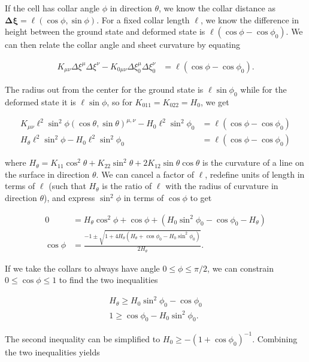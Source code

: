 \documentclass[draft]{article}
\begin{document}
If the cell has collar angle $\phi$ in direction $\theta$, we know the collar distance as $\bm{\Delta\xi} = \ell(\cos\phi, \sin\phi)$. For a fixed collar length $\ell$, we know the difference in height between the ground state and deformed state is $\ell(\cos\phi - \cos\phi_0)$. We can then relate the collar angle and sheet curvature by equating 

\begin{align}
    K_{\mu\nu}\Delta\xi^\mu\Delta\xi^\nu - K_{0\mu\nu}\Delta\xi_0^\mu\Delta\xi_0^\nu &= \ell(\cos\phi - \cos\phi_0). \label{eq:base}
\end{align}

The radius out from the center for the ground state is $\ell\sin\phi_0$ while for the deformed state it is $\ell\sin\phi$, so for $K_{011}=K_{022}=H_0$, we get

\begin{align*}
    K_{\mu\nu}\ell^2\sin^2\phi (\cos\theta, \sin\theta)^{\mu,\nu} - H_0 \ell^2\sin^2\phi_0 &= \ell(\cos\phi - \cos\phi_0) \\
    H_\theta \ell^2\sin^2\phi - H_0 \ell^2\sin^2\phi_0 &= \ell(\cos\phi - \cos\phi_0)
\end{align*}

\noindent where $H_\theta = K_{11}\cos^2\theta + K_{22}\sin^2\theta + 2K_{12}\sin\theta\cos\theta$ is the curvature of a line on the surface in direction $\theta$. We can cancel a factor of $\ell$, redefine units of length in terms of $\ell$ (such that $H_\theta$ is the ratio of $\ell$ with the radius of curvature in direction $\theta$), and express $\sin^2\phi$ in terms of $\cos\phi$ to get

\begin{align*}
    0 &= H_\theta \cos^2\phi + \cos\phi + (H_0\sin^2\phi_0 - \cos\phi_0 - H_\theta) \\
    \cos\phi &= \frac{-1 \pm \sqrt{1 + 4H_\theta (H_\theta + \cos\phi_0 - H_0\sin^2\phi_0)}}{2H_\theta}.
\end{align*}

If we take the collars to always have angle $0 \leq \phi \leq \pi/2$, we can constrain $0 \leq \cos\phi \leq 1$ to find the two inequalities 

\begin{align}
    H_\theta \geq H_0 \sin^2\phi_0 - \cos\phi_0 \label{eq:ineq1}\\
    1 \geq \cos\phi_0 - H_0 \sin^2\phi_0. \label{eq:ineq2}
\end{align}

\noindent The second inequality can be simplified to $H_0 \geq -(1+\cos\phi_0)^{-1}$. Combining the two inequalities yields 
\end{document}

